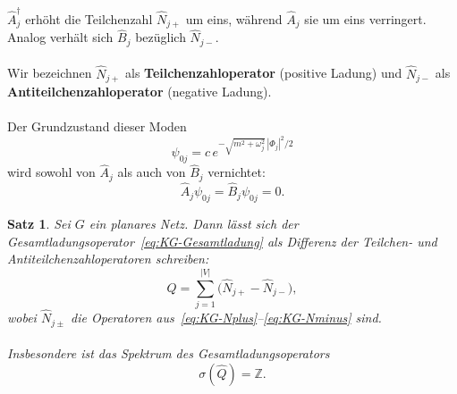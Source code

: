 \documentclass[11pt,a4paper,leqno]{report}
\newtheorem{proposition}{Satz}[chapter]
\numberwithin{equation}{chapter}
\begin{document}
\noindent
$\hat{A}_j^\dagger$ erhöht die Teilchenzahl $\hat{N}_{j+}$ um eins, während $\hat{A}_j$ sie um eins verringert. Analog verhält sich $\hat{B}_j$ bezüglich $\hat{N}_{j-}$.
\\
\\
Wir bezeichnen $\hat{N}_{j+}$ als \textbf{Teilchenzahloperator} (positive Ladung) und $\hat{N}_{j-}$ als \textbf{Antiteilchenzahloperator} (negative Ladung).
\\
\\
Der Grundzustand dieser Moden
\[
\psi_{0j} = c\,e^{-\sqrt{m^2 + \omega_j^2}\,|\Phi_j|^2/2}
\]
wird sowohl von $\hat{A}_j$ als auch von $\hat{B}_j$ vernichtet:
\begin{equation}\label{eq:KG-vakuum}
	\hat{A}_j\psi_{0j} = \hat{B}_j\psi_{0j} = 0.
\end{equation}
\noindent
\begin{proposition}\label{prop:KG-Ladungsoperator}
	Sei $G$ ein planares Netz. Dann lässt sich der Gesamtladungsoperator~\eqref{eq:KG-Gesamtladung} als Differenz der Teilchen- und Antiteilchenzahloperatoren schreiben:
	\begin{equation}\label{eq:KG-Q-Teilchenzahlen}
		\hat{Q} = \sum_{j=1}^{|V|}\bigl(\hat{N}_{j+} - \hat{N}_{j-}\bigr),
	\end{equation}
	wobei $\hat{N}_{j\pm}$ die Operatoren aus~\eqref{eq:KG-Nplus}--\eqref{eq:KG-Nminus} sind.
	\\
	\\
	Insbesondere ist das Spektrum des Gesamtladungsoperators
	\[
	\sigma(\hat{Q}) = \mathbb{Z}.
	\]
\end{proposition}
\end{document}
